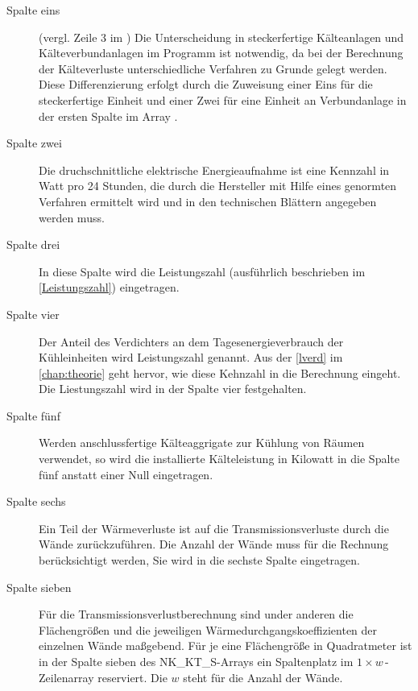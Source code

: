 \begin{description}

	\item [{Spalte eins}] (vergl. Zeile 3 im ) Die Unterscheidung in steckerfertige
	Kälteanlagen und Kälteverbundanlagen im Programm ist notwendig, da bei
	der Berechnung der Kälteverluste unterschiedliche Verfahren zu Grunde
	gelegt werden.  Diese Differenzierung
	erfolgt durch die Zuweisung einer Eins für die steckerfertige Einheit
	und einer Zwei für eine Einheit an Verbundanlage in der ersten Spalte im
	Array .

	\item [{Spalte zwei}] Die druchschnittliche elektrische Energieaufnahme
	ist eine Kennzahl in Watt pro 24 Stunden, die durch die Hersteller mit
	Hilfe eines genormten Verfahren ermittelt wird und in den technischen
	Blättern angegeben werden muss.

	\item [{Spalte drei}] In diese Spalte wird die Leistungszahl
	(ausführlich beschrieben im \cref{Leistungszahl}) eingetragen.

	\item [{Spalte vier}] Der Anteil des Verdichters an dem
	Tagesenergieverbrauch der Kühleinheiten wird Leistungszahl genannt. Aus
	der \cref{lverd} im \cref{chap:theorie} geht hervor, wie diese Kehnzahl
	in die Berechnung eingeht. Die Liestungszahl wird in der Spalte vier
	festgehalten.

	\item [{Spalte fünf}] Werden anschlussfertige Kälteaggrigate zur Kühlung
	von Räumen verwendet, so wird die installierte Kälteleistung in Kilowatt
	in die Spalte fünf anstatt einer Null eingetragen.

	\item [{Spalte sechs}] Ein Teil der Wärmeverluste ist auf die
	Transmissionsverluste durch die Wände zurückzuführen.  Die Anzahl der
	Wände muss für die Rechnung berücksichtigt werden, Sie wird in die
	sechste Spalte eingetragen.
	
	\item [{Spalte sieben}] Für die Transmissionsverlustberechnung sind
	under anderen die Flächengrößen und die jeweiligen
	Wärmedurchgangskoeffizienten der einzelnen Wände
	maßgebend. Für je
	eine Flächengröße in Quadratmeter ist in der Spalte sieben des
	NK\_KT\_S-Arrays ein Spaltenplatz im $1\times w\,$-Zeilenarray
	reserviert. Die $w$ steht für die Anzahl der Wände.


\end{description}
